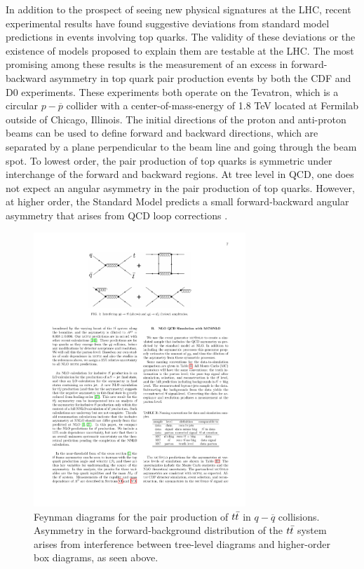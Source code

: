In addition to the prospect of seeing new physical signatures at the LHC,
recent experimental results have found suggestive deviations from standard model predictions in events involving top quarks.
The validity of these deviations or the existence of models proposed to explain them are testable at the LHC.
The most promising among these results is the measurement of an excess in forward-backward asymmetry in top quark pair production events by both the CDF and D0 experiments.
These experiments both operate on the Tevatron, which is a circular $p-\overline{p}$ collider with a center-of-mass-energy of 1.8 TeV located at Fermilab outside of Chicago, Illinois.
The initial directions of the proton and anti-proton beams can be used to define forward and backward directions,
which are separated by a plane perpendicular to the beam line and going through the beam spot.
To lowest order, the pair production of top quarks is symmetric under interchange of the forward and backward regions.
At tree level in QCD, one does not expect an angular asymmetry in the pair production of top quarks.
However, at higher order, the Standard Model predicts a small forward-backward angular asymmetry that arises from QCD loop corrections \cite{Aaltonen:1318520}.
\begin{figure}
  \begin{center}
    \includegraphics[width=80mm]{figures/theory/ttbarForwardBackwardFeynman}
  \end{center}
  \caption{Feynman diagrams for the pair production of $t\bar{t}$ in $q-\overline{q}$ collisions.  Asymmetry in the forward-background distribution of the $t\bar{t}$ system arises from interference between tree-level diagrams and higher-order box diagrams, as seen above.}
  \label{img:ForwardBackwardFeynman}
\end{figure}
